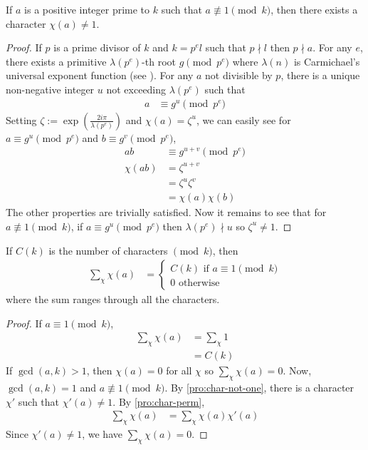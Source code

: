 \documentclass[elemannt.tex]{subfile}
\begin{document}
		\begin{proposition}\label{pro:char-not-one}
			If $a$ is a positive integer prime to $k$ such that $a\not\equiv1\pmod{k}$, then there exists a character $\chi(a)\neq1$.
		\end{proposition}

		\begin{proof}
			If $p$ is a prime divisor of $k$ and $k=p^{e}l$ such that $p\nmid l$ then $p\nmid a$. For any $e$, there exists a primitive $\lambda(p^{e})$-th root $g\pmod{p^{e}}$ where $\lambda(n)$ is Carmichael's universal exponent function (see \textcite[pp. 90]{billal_riasat_2021}). For any $a$ not divisible by $p$, there is a unique non-negative integer $u$ not exceeding $\lambda(p^{e})$ such that
				\begin{align*}
					a
						& \equiv g^{u}\pmod{p^{e}}
				\end{align*}
			Setting $\zeta:=\exp\left(\frac{2i\pi}{\lambda(p^{e})}\right)$ and $\chi(a)=\zeta^{u}$, we can easily see for $a\equiv g^{u}\pmod{p^{e}}$ and $b\equiv g^{v}\pmod{p^{e}}$,
				\begin{align*}
					ab
						& \equiv g^{u+v}\pmod{p^{e}}\\
					\chi(ab)
						& = \zeta^{u+v}\\
						& =\zeta^{u}\zeta^{v}\\
						& = \chi(a)\chi(b)
				\end{align*}
			The other properties are trivially satisfied. Now it remains to see that for $a\not\equiv1\pmod{k}$, if $a\equiv g^{u}\pmod{p^{e}}$ then $\lambda(p^{e})\nmid u$ so $\zeta^{u}\neq1$.
		\end{proof}

		\begin{proposition}\label{pro:sum-for-char}
			If $C(k)$ is the number of characters $\pmod{k}$, then
				\begin{align*}
					\sum_{\chi}\chi(a)
						& =
							\begin{cases}
								C(k)\mbox{ if }a\equiv1\pmod{k}\\
								0\mbox{ otherwise}
							\end{cases}
				\end{align*}
			where the sum ranges through all the characters.
		\end{proposition}

		\begin{proof}
			If $a\equiv1\pmod{k}$,
				\begin{align*}
					\sum_{\chi}\chi(a)
						& = \sum_{\chi}1\\
						& = C(k)
				\end{align*}
			If $\gcd(a,k)>1$, then $\chi(a)=0$ for all $\chi$ so $\sum_{\chi}\chi(a)=0$. Now, $\gcd(a,k)=1$ and $a\not\equiv1\pmod{k}$. By \autoref{pro:char-not-one}, there is a character $\chi'$ such that $\chi'(a)\neq1$. By \autoref{pro:char-perm},
				\begin{align*}
					\sum_{\chi}\chi(a)
						& = \sum_{\chi}\chi(a)\chi'(a)
				\end{align*}
			Since $\chi'(a)\neq1$, we have $\sum_{\chi}\chi(a)=0$.
		\end{proof}
\end{document}
